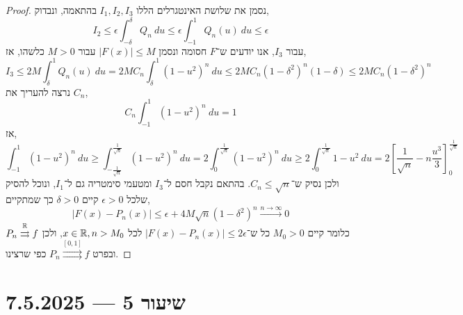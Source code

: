 \begin{proof}
	נסמן את שלושת האינטגרלים הללו $I_1, I_2, I_3$ בהתאמה, ונבדוק,
	\[
		I_2
		\le \epsilon \int_{-\delta}^{\delta} Q_n\ du
		\le \epsilon \int_{-1}^{1} Q_n(u)\ du
		\le \epsilon
	\]
	עבור $I_3$, אנו יודעים ש־$F$ חסומה ונסמן $|F(x)| \le M$ עבור $M > 0$ כלשהו, אז,
	\[
		I_3
		\le 2M \int_{\delta}^{1} Q_n(u)\ du
		= 2M C_n \int_{\delta}^{1} {(1 - u^2)}^n\ du
		\le 2M C_n {(1 - \delta^2)}^n (1 - \delta)
		\le 2M C_n {(1 - \delta^2)}^n
	\]
	נרצה להעריך את $C_n$,
	\[
		C_n \int_{-1}^{1} {(1 - u^2)}^n\ du = 1
	\]
	אז,
	\[
		\int_{-1}^{1} {(1 - u^2)}^n\ du
		\ge \int_{-\frac{1}{\sqrt{n}}}^{\frac{1}{\sqrt{n}}} {(1 - u^2)}^n\ du
		= 2 \int_0^{\frac{1}{\sqrt{n}}} {(1 - u^2)}^n\ du
		\ge 2 \int_0^{\frac{1}{\sqrt{n}}} 1 - u^2\ du
		= 2 {\left[ \frac{1}{\sqrt{n}} - n \frac{u^3}{3}\right]}_0^{\frac{1}{\sqrt{n}}}
	\]
	ולכן נסיק ש־$C_n \le \sqrt{n}$.
	בהתאם נקבל חסם ל־$I_3$ ומטעמי סימטריה גם ל־$I_1$, ונוכל להסיק שלכל $\epsilon > 0$ קיים $\delta > 0$ כך שמתקיים,
	\[
		|F(x) - P_n(x)|
		\le \epsilon + 4M \sqrt{n} {(1 - \delta^2)}^n
		\xrightarrow{n \to \infty} 0
	\]
	כלומר קיים $M_0 > 0$ כל ש־$|F(x) - P_n(x)| \le 2 \epsilon$ לכל $x \in \mathbb{R}, n > M_0$, ולכן $P_n \overset{\mathbb{R}}{\rightrightarrows} f$ ובפרט $P_n \overset{[0, 1]}{\rightrightarrows} f$ כפי שרצינו.
\end{proof}

\section{שיעור 5 --- 7.5.2025}
